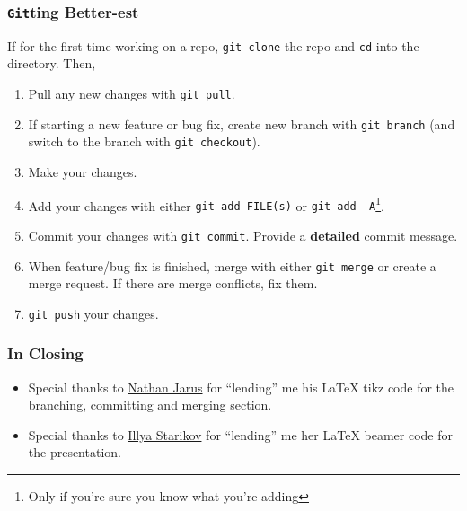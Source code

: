 \documentclass{beamer}
\newcounter{branching}
\newcounter{committing}
\newcounter{merging}
\newcounter{conflicts}
\newcommand{\shellcmd}[1]{\texttt{\colorbox{gray!30}{#1}}}
\begin{document}
\begin{frame}
    \frametitle{\shellcmd{Git}ting Better-est}

    If for the first time working on a repo, \shellcmd{git clone} the repo and \shellcmd{cd} into the directory. Then,

    \begin{enumerate}
        \item Pull any new changes with \shellcmd{git pull}.
        \item If starting a new feature or bug fix, create new branch with \shellcmd{git branch} (and switch to the branch with \shellcmd{git checkout}).
        \item Make your changes.
        \item Add your changes with either \shellcmd{git add FILE(s)} or \shellcmd{git add -A}\footnote{Only if you're sure you know what you're adding}.
        \item Commit your changes with \shellcmd{git commit}. Provide a \textbf{detailed} commit message.
        \item When feature/bug fix is finished, merge with either \shellcmd{git merge} or create a merge request. If there are merge conflicts, fix them.
        \item \shellcmd{git push} your changes.
    \end{enumerate}

\end{frame}


\begin{frame}
    \frametitle{In Closing}
    \begin{itemize}
     \item Special thanks to \href{http://web.mst.edu/~nmjxv3/}{Nathan Jarus} for ``lending'' me his \LaTeX{} tikz code for the branching, committing and merging section.
     \item Special thanks to \href{https://github.com/IllyaStarikov}{Illya Starikov} for ``lending'' me her \LaTeX{} beamer code for the presentation.
    \end{itemize}
    
\end{frame}
\end{document}
